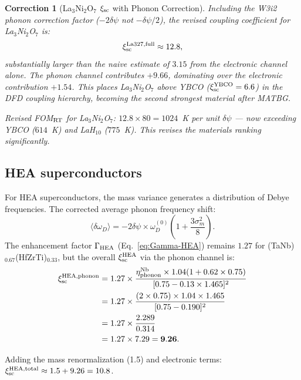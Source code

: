 \documentclass[11pt]{article}
\newtheorem{correction}{Correction}
\begin{document}
\begin{correction}[La$_3$Ni$_2$O$_7$ $\xi_{\rm sc}$ with Phonon Correction]
\label{cor:La327-phonon}
Including the W3i2 phonon correction factor ($-2\delta\psi$ not $-\delta\psi/2$),
the revised coupling coefficient for La$_3$Ni$_2$O$_7$ is:
\begin{equation}
\xi_{\rm sc}^{\rm La327, full} \approx 12.8,
\end{equation}
substantially larger than the naive estimate of $3.15$ from the electronic
channel alone. The phonon channel contributes $+9.66$, dominating over the
electronic contribution $+1.54$. This places La$_3$Ni$_2$O$_7$ above YBCO
($\xi_{\rm sc}^{\rm YBCO} = 6.6$) in the DFD coupling hierarchy,
becoming the second strongest material after MATBG.

Revised FOM$_{\rm RT}$ for La$_3$Ni$_2$O$_7$:
$12.8 \times 80 = 1024$~K per unit $\delta\psi$ --- now exceeding YBCO
($614$~K) and LaH$_{10}$ ($775$~K). This revises the materials ranking
significantly.
\end{correction}

\subsection{HEA superconductors}

For HEA superconductors, the mass variance generates a distribution of
Debye frequencies. The corrected average phonon frequency shift:
\begin{equation}
\langle\delta\omega_D\rangle = -2\delta\psi \times \omega_D^{(0)}\left(1 + \frac{3\sigma_m^2}{8}\right).
\label{eq:phonon-HEA-corrected}
\end{equation}
The enhancement factor $\Gamma_{\rm HEA}$ (Eq.~\ref{eq:Gamma-HEA})
remains $1.27$ for (TaNb)$_{0.67}$(HfZrTi)$_{0.33}$, but the overall
$\xi_{\rm sc}^{\rm HEA}$ via the phonon channel is:
\begin{align}
\xi_{\rm sc}^{\rm HEA, phonon}
&= 1.27 \times \frac{\eta_{\rm phonon}^{\rm Nb} \times 1.04(1+0.62\times0.75)}{[0.75-0.13\times1.465]^2}\notag\\
&= 1.27 \times \frac{(2\times0.75)\times1.04\times1.465}{[0.75-0.190]^2}\notag\\
&= 1.27 \times \frac{2.289}{0.314}\notag\\
&= 1.27 \times 7.29 = \mathbf{9.26}.
\label{eq:xi-HEA-phonon}
\end{align}

Adding the mass renormalization (1.5) and electronic terms:
$\xi_{\rm sc}^{\rm HEA, total} \approx 1.5 + 9.26 = 10.8$.
\end{document}
